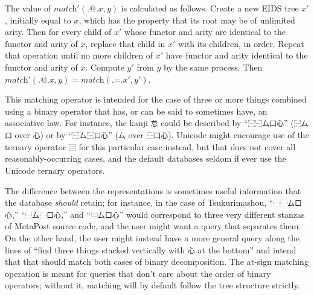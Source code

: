\documentclass[twocolumn]{report}
\begin{document}
The value of $\textit{match}'(\texttt{.@.}x,y)$ is calculated as follows. 
Create a new EIDS tree $x'$, initially equal to $x$, which has the property
that its root may be of unlimited arity.  Then for every child of $x'$ whose
functor and arity are identical to the functor and arity of $x$, replace
that child in $x'$ with its children, in order.  Repeat that operation until
no more children of $x'$ have functor and arity identical to the
functor and arity of $x$.  Compute $y'$ from $y$ by the same process.  Then
$\textit{match}'(\texttt{.@.}x,y)=\textit{match}(\texttt{.=.}x',y')$.

This matching operator is intended for the case of three or more
things combined using a binary operator that has, or can be said to sometimes
have, an associative law.  For instance, the kanji \texttt{怠} could be
described by ``\texttt{⿱⿱厶口心}'' (\texttt{⿱厶口} over \texttt{心}) or
by ``\texttt{⿱厶⿱口心}'' (\texttt{厶} over \texttt{⿱口心}).  Unicode
might encourage use of the ternary operator \texttt{⿳} for this particular
case instead, but that does not cover all reasonably-occurring cases, and
the default databases seldom if ever use the Unicode ternary operators.

The difference between the representations is sometimes useful information
that the database \emph{should} retain; for instance, in the case of
Tsukurimashou, ``\texttt{⿱⿱厶口心},'' ``\texttt{⿱厶⿱口心},'' and
``\texttt{⿳厶口心}'' would correspond to three very different
stanzas of MetaPost source code, and the user might want a query
that separates them.  On the other hand, the user might instead have a more
general query along the lines of ``find three things stacked vertically with
\texttt{心} at the bottom'' and intend that that should match both cases of
binary decomposition.  The at-sign matching operation is meant for queries
that don't care about the order of binary operators; without it, matching
will by default follow the tree structure strictly.
\end{document}
